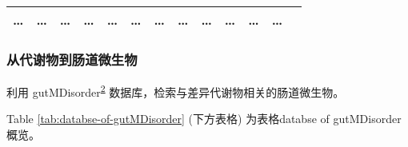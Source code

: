 \documentclass[
]{article}
\begin{document}
\begin{longtable}[]{@{}lllllllllllll@{}}
\begin{minipage}[t]{0.05\columnwidth}
\ldots{}\strut
\end{minipage} & \begin{minipage}[t]{0.05\columnwidth}\raggedright
\ldots{}\strut
\end{minipage} & \begin{minipage}[t]{0.05\columnwidth}\raggedright
\ldots{}\strut
\end{minipage} & \begin{minipage}[t]{0.05\columnwidth}\raggedright
\ldots{}\strut
\end{minipage} & \begin{minipage}[t]{0.07\columnwidth}\raggedright
\ldots{}\strut
\end{minipage} & \begin{minipage}[t]{0.07\columnwidth}\raggedright
\ldots{}\strut
\end{minipage} & \begin{minipage}[t]{0.05\columnwidth}\raggedright
\ldots{}\strut
\end{minipage} & \begin{minipage}[t]{0.04\columnwidth}\raggedright
\ldots{}\strut
\end{minipage} & \begin{minipage}[t]{0.05\columnwidth}\raggedright
\ldots{}\strut
\end{minipage} & \begin{minipage}[t]{0.05\columnwidth}\raggedright
\ldots{}\strut
\end{minipage} & \begin{minipage}[t]{0.05\columnwidth}\raggedright
\ldots{}\strut
\end{minipage} & \begin{minipage}[t]{0.02\columnwidth}\raggedright
\ldots{}\strut
\end{minipage}\tabularnewline
\bottomrule
\end{longtable}

\hypertarget{ux4eceux4ee3ux8c22ux7269ux5230ux80a0ux9053ux5faeux751fux7269}{%
\subsubsection{从代谢物到肠道微生物}\label{ux4eceux4ee3ux8c22ux7269ux5230ux80a0ux9053ux5faeux751fux7269}}

利用 gutMDisorder\textsuperscript{\protect\hyperlink{ref-GutmdisorderACheng2019}{2}} 数据库，检索与差异代谢物相关的肠道微生物。

Table \ref{tab:databse-of-gutMDisorder} (下方表格) 为表格databse of gutMDisorder概览。
\end{document}
